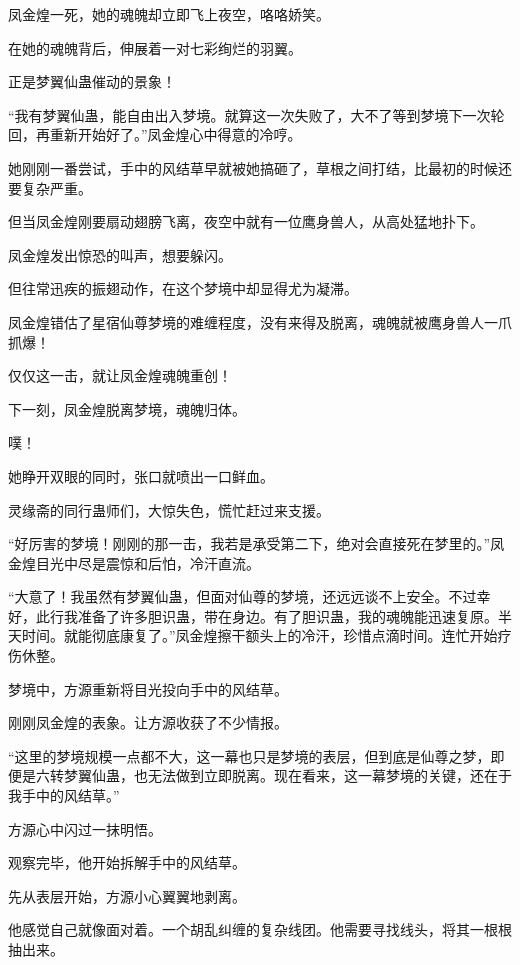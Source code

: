 
\begin{this_body}

凤金煌一死，她的魂魄却立即飞上夜空，咯咯娇笑。

在她的魂魄背后，伸展着一对七彩绚烂的羽翼。

正是梦翼仙蛊催动的景象！

“我有梦翼仙蛊，能自由出入梦境。就算这一次失败了，大不了等到梦境下一次轮回，再重新开始好了。”凤金煌心中得意的冷哼。

她刚刚一番尝试，手中的风结草早就被她搞砸了，草根之间打结，比最初的时候还要复杂严重。

但当凤金煌刚要扇动翅膀飞离，夜空中就有一位鹰身兽人，从高处猛地扑下。

凤金煌发出惊恐的叫声，想要躲闪。

但往常迅疾的振翅动作，在这个梦境中却显得尤为凝滞。

凤金煌错估了星宿仙尊梦境的难缠程度，没有来得及脱离，魂魄就被鹰身兽人一爪抓爆！

仅仅这一击，就让凤金煌魂魄重创！

下一刻，凤金煌脱离梦境，魂魄归体。

噗！

她睁开双眼的同时，张口就喷出一口鲜血。

灵缘斋的同行蛊师们，大惊失色，慌忙赶过来支援。

“好厉害的梦境！刚刚的那一击，我若是承受第二下，绝对会直接死在梦里的。”凤金煌目光中尽是震惊和后怕，冷汗直流。

“大意了！我虽然有梦翼仙蛊，但面对仙尊的梦境，还远远谈不上安全。不过幸好，此行我准备了许多胆识蛊，带在身边。有了胆识蛊，我的魂魄能迅速复原。半天时间。就能彻底康复了。”凤金煌擦干额头上的冷汗，珍惜点滴时间。连忙开始疗伤休整。

梦境中，方源重新将目光投向手中的风结草。

刚刚凤金煌的表象。让方源收获了不少情报。

“这里的梦境规模一点都不大，这一幕也只是梦境的表层，但到底是仙尊之梦，即便是六转梦翼仙蛊，也无法做到立即脱离。现在看来，这一幕梦境的关键，还在于我手中的风结草。”

方源心中闪过一抹明悟。

观察完毕，他开始拆解手中的风结草。

先从表层开始，方源小心翼翼地剥离。

他感觉自己就像面对着。一个胡乱纠缠的复杂线团。他需要寻找线头，将其一根根抽出来。


\end{this_body}
